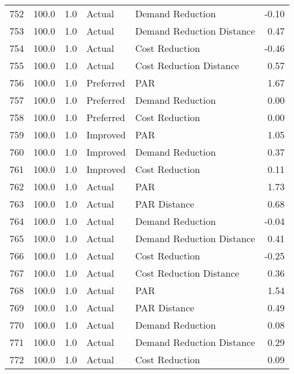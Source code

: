 \begin{longtable}{lrrllr}
752  &        100.0 &     1.0 &         Actual &           Demand Reduction &  -0.10 \\
753  &        100.0 &     1.0 &         Actual &  Demand Reduction Distance &   0.47 \\
754  &        100.0 &     1.0 &         Actual &             Cost Reduction &  -0.46 \\
755  &        100.0 &     1.0 &         Actual &    Cost Reduction Distance &   0.57 \\
756  &        100.0 &     1.0 &      Preferred &                        PAR &   1.67 \\
757  &        100.0 &     1.0 &      Preferred &           Demand Reduction &   0.00 \\
758  &        100.0 &     1.0 &      Preferred &             Cost Reduction &   0.00 \\
759  &        100.0 &     1.0 &       Improved &                        PAR &   1.05 \\
760  &        100.0 &     1.0 &       Improved &           Demand Reduction &   0.37 \\
761  &        100.0 &     1.0 &       Improved &             Cost Reduction &   0.11 \\
762  &        100.0 &     1.0 &         Actual &                        PAR &   1.73 \\
763  &        100.0 &     1.0 &         Actual &               PAR Distance &   0.68 \\
764  &        100.0 &     1.0 &         Actual &           Demand Reduction &  -0.04 \\
765  &        100.0 &     1.0 &         Actual &  Demand Reduction Distance &   0.41 \\
766  &        100.0 &     1.0 &         Actual &             Cost Reduction &  -0.25 \\
767  &        100.0 &     1.0 &         Actual &    Cost Reduction Distance &   0.36 \\
768  &        100.0 &     1.0 &         Actual &                        PAR &   1.54 \\
769  &        100.0 &     1.0 &         Actual &               PAR Distance &   0.49 \\
770  &        100.0 &     1.0 &         Actual &           Demand Reduction &   0.08 \\
771  &        100.0 &     1.0 &         Actual &  Demand Reduction Distance &   0.29 \\
772  &        100.0 &     1.0 &         Actual &             Cost Reduction &   0.09 \\

\end{longtable}
